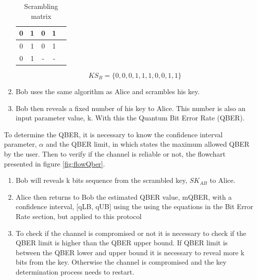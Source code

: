 \begin{enumerate}
	\begin{table}[hbt]
		\centering
		\caption{Scrambling matrix}
		\label{tb:scram}
		\begin{tabular}{|c|c|c|c|c|}
			\hline
				0 & 1 & 0 & 1 \\ \hline
			    0 & 1 & 0 & 1 \\ \hline
				0 & 1 & - & - \\ \hline
		\end{tabular}
	\end{table}

	$$KS_{B} = \{0,0,0,1,1,1,0,0,1,1\}$$	
	
	\item Bob uses the same algorithm as Alice and scrambles his key.
	
	\item Bob then reveals a fixed number of his key to Alice. This number is also an input parameter value, k. With this the Quantum Bit Error Rate (QBER).
		
\end{enumerate}

	To determine the QBER, it is necessary to know the confidence interval parameter, $\alpha$ and the QBER limit, in which states the maximum allowed QBER by the user.
	Then to verify if the channel is reliable or not, the flowchart presented in figure \ref{fig:flowQber}.
	
	\begin{enumerate}
		\item Bob will reveals k bits sequence from the scrambled key, $SK_{AB}$ to Alice.
		\item Alice then returns to Bob the estimated QBER value, mQBER, with a confidence interval, [qLB, qUB] using the using the equations in the Bit Error Rate section, but applied to this protocol
		\item To check if the channel is compromised or not it is necessary to check if the QBER limit is higher than the QBER upper bound. If QBER limit is between the QBER lower and upper bound it is necessary to reveal more k bits from the key. Otherwise the channel is compromised and the key determination process needs to restart.
	\end{enumerate}
	
